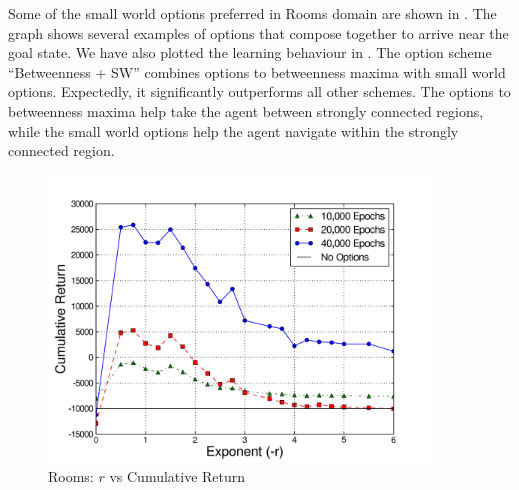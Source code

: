\begin{figure}[tbh]
  \centering
   \hspace{0.25in}
\end{figure}

Some of the small world options preferred in Rooms domain are shown in
. The graph shows several examples of options
that compose together to arrive near the goal state. We have also
plotted the learning behaviour in . The option
scheme ``Betweenness + SW'' combines options to betweenness maxima with
small world options. Expectedly, it significantly outperforms all other
schemes. The options to betweenness maxima help take the agent between
strongly connected regions, while the small world options help the agent
navigate within the strongly connected region.

\begin{figure}[th]
  \centering
      \includegraphics[width=4in]{figures/rooms-exp}
      \caption{Rooms: $r$ vs Cumulative Return}
      \label{fig:rooms-exp}
\end{figure}

